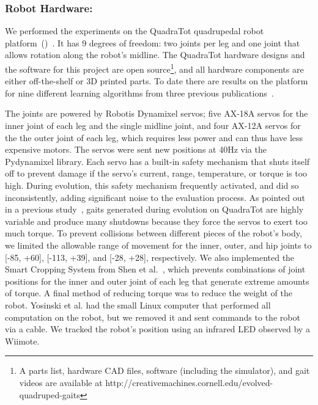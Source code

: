 \subsubsection{Robot Hardware:}

We performed the experiments on the QuadraTot quadrupedal robot platform~()~\cite{yos:clune}.
It has 9 degrees of freedom: two joints per leg and one joint that allows rotation along the robot's midline. %
The QuadraTot hardware designs and the software for this project are open source\footnote{A parts list, hardware CAD files, software (including the simulator), and gait videos are available at http://creativemachines.cornell.edu/evolved-quadruped-gaits}, and all hardware components are either off-the-shelf or 3D printed parts. %
To date there are results on the platform for nine different learning algorithms from three previous publications~\cite{yos:clune,glette,haocheng}. 


The joints are powered by Robotis Dynamixel servos; five AX-18A servos for the inner joint of each leg and the single midline joint, and four AX-12A servos for the the outer joint of each leg, which requires less power and can thus have less expensive motors. The servos were sent new positions at 40Hz via the Pydynamixel library. Each servo has a built-in safety mechanism that shuts itself off to prevent damage if the servo's current, range, temperature, or torque is too high. During evolution, this safety mechanism frequently activated, and did so inconsistently, adding significant noise to the evaluation process. As pointed out in a previous study~\cite{yos:clune}, gaits generated during evolution on QuadraTot are highly variable and produce many shutdowns because they force the servos to exert too much torque.
To prevent collisions between different pieces of the robot's body, we limited the allowable range of movement for the inner, outer, and hip joints to [-85\degree, +60\degree], [-113\degree, +39\degree], and [-28\degree, +28\degree], respectively. We also implemented the Smart Cropping System from Shen et al.~\cite{haocheng}, which prevents combinations of joint positions for the inner and outer joint of each leg that generate extreme amounts of torque. A final method of reducing torque was to reduce the weight of the robot. Yosinski et al. had the small Linux computer that performed all computation on the robot, but we removed it and sent commands to the robot via a cable. We tracked the robot's position using an infrared LED observed by a Wiimote.
